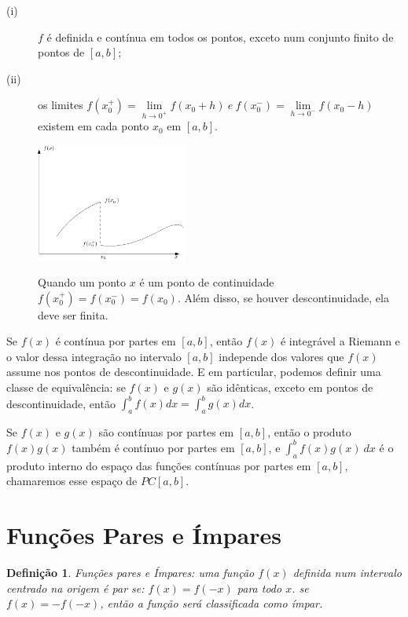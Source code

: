 \documentclass[a4paper,portuguese,9pt,final]{extarticle}
\newtheorem*{definition}{Definição}
\begin{document}
\begin{multicols*}{2}
        \begin{description}
            \item[(i)] $f$ é definida e contínua em todos os pontos, exceto num conjunto finito de pontos de $[a,b]$;
            \item[(ii)] os limites $ f(x_{0}^{+}) = \displaystyle\lim\limits_{h\to0^{+}} f(x_{0}+h) \ e \  f(x_{0}^{-}) = \lim\limits_{h\to0^{-}} f(x_{0}-h) $ existem em cada ponto $x_{0}$ em $[a,b]$. 

            \includegraphics[width=0.4\textwidth]{funcao_cp}

            Quando um ponto $x$ é um ponto de continuidade $\displaystyle f(x_{0}^{+}) = f(x_{0}^{-}) = f(x_{0}) $. Além disso, se houver descontinuidade, ela deve ser finita.
        \end{description}


        Se $f(x)$ é contínua por partes em $[a,b]$, então $f(x)$ é integrável a Riemann e o valor dessa integração no intervalo $[a,b]$ independe dos valores que $f(x)$ assume nos pontos de descontinuidade. E em particular, podemos definir uma classe de equivalência: se $ f(x) $ e $ g(x) $ são idênticas, exceto em pontos de descontinuidade, então $\displaystyle \int_{a}^{b} f(x)dx=\int_{a}^{b} g(x)dx $. 


        Se $f(x)$ e $g(x)$ são contínuas por partes em $[a,b]$, então o produto $f(x)g(x)$ também é contínuo por partes em $[a,b]$, e $ \int_{a}^{b}f(x)g(x) \ dx $ é o produto interno do espaço das funções contínuas por partes em $[a,b]$, chamaremos esse espaço de $PC[a,b]$. 



    \section{Funções Pares e Ímpares}


        \begin{definition}	
            
            Funções pares e Ímpares: uma função $ f(x) $ definida num intervalo centrado na origem é par se: $ f(x)=f(-x) $ para todo $ x $. se $ f(x)=-f(-x) $, então a função será classificada como ímpar.\\
        \end{definition} 



\end{multicols*}
\end{document}
